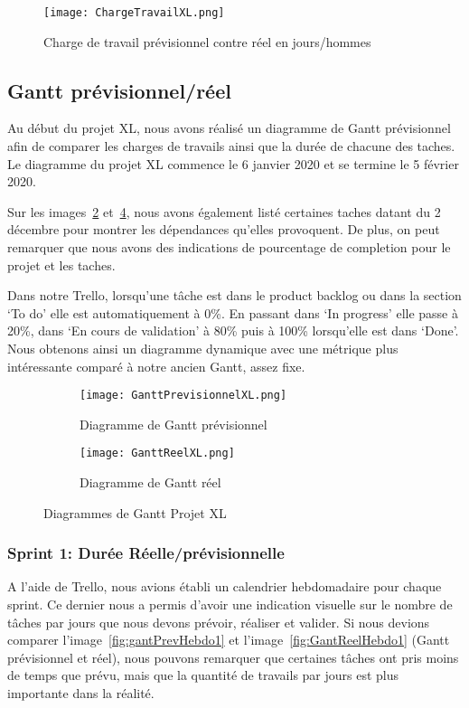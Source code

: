 \begin{figure}[h!]
  \centering
  \texttt{[image: ChargeTravailXL.png]}
	\caption[]{Charge de travail prévisionnel contre réel en jours/hommes}
	\label{fig:chargeReel}
\end{figure}



\subsection{Gantt prévisionnel/réel}
Au début du projet XL, nous avons réalisé un diagramme de Gantt prévisionnel afin de comparer les charges de travails ainsi que la durée de chacune des taches.
Le diagramme du projet XL commence le 6 janvier 2020 et se termine le 5 février 2020. 

Sur les images~\ref{fig:gantXLprev} et~\ref{fig:gantXLreel}, nous avons également listé certaines taches datant du 2 décembre pour montrer les dépendances qu'elles provoquent.
De plus, on peut remarquer que nous avons des indications de pourcentage de completion pour le projet et les taches.

Dans notre Trello, lorsqu'une tâche est dans le product backlog ou dans la section `To do' elle est automatiquement à 0\%.
En passant dans `In progress' elle passe à 20\%, dans `En cours de validation' à 80\% puis à 100\% lorsqu'elle est dans `Done'.
Nous obtenons ainsi un diagramme dynamique avec une métrique plus intéressante comparé à notre ancien Gantt, assez fixe.

\begin{figure}
   \centering
   \begin{subfigure}{.5\textwidth}
     \centering
     \texttt{[image: GanttPrevisionnelXL.png]}
   	\caption{Diagramme de Gantt prévisionnel}
   	\label{fig:gantXLprev}
   \end{subfigure}%
   \begin{subfigure}{.5\textwidth}
     \centering
     \texttt{[image: GanttReelXL.png]}
   	\caption{Diagramme de Gantt réel}
   	\label{fig:gantXLreel}
   \end{subfigure}
   \caption{Diagrammes de Gantt Projet XL}
\end{figure}

\subsubsection{Sprint 1: Durée Réelle/prévisionnelle}
A l'aide de Trello, nous avions établi un calendrier hebdomadaire pour chaque sprint.
Ce dernier nous a permis d’avoir une indication visuelle sur le nombre de tâches par jours que nous devons prévoir, réaliser et valider.
Si nous devions comparer l'image~\ref{fig:gantPrevHebdo1} et l'image~\ref{fig:GantReelHebdo1} (Gantt prévisionnel et réel), nous pouvons remarquer que certaines tâches ont pris moins de temps que prévu, mais que la quantité de travails par jours est plus importante dans la réalité.

